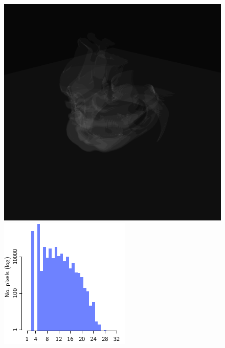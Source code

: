 \documentclass{egpubl}
\newlength{\boxheight}
\begin{document}
\begin{figure}[p]
\begin{minipage}[b][\boxheight][b]{0.24\linewidth}
\begin{minipage}[t]{0.98\linewidth}
      \includegraphics[width=\linewidth]{snapshots/space/space_dci-wp64}%
    \end{minipage}%
    \vfill%
    \begin{minipage}[b]{0.98\linewidth}
      \centering
      \includegraphics[width=1\linewidth]{figures/plot-dch-space}\vspace{-2mm}

\end{minipage}
\end{minipage}
\end{figure}
\end{document}
